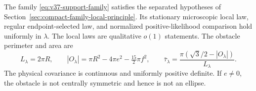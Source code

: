 \begin{proposition}
\label{prop:v37-support-family}
The family \eqref{eq:v37-support-family} satisfies the separated
hypotheses of Section~\ref{sec:compact-family-local-principle}.
Its stationary microscopic local law, regular endpoint-selected law,
and normalized positive-likelihood comparison hold uniformly in
$\lambda$. The local laws are qualitative $o(1)$ statements.
The obstacle perimeter and area are
\begin{equation}\label{eq:v37-support-area}
 L_\lambda=2\pi R,\qquad
 |O_\lambda|=\pi R^2-4\pi e^2-\tfrac{15}{2}\pi f^2,
 \qquad
 \bar\tau_\lambda=\frac{\pi(\sqrt3/2-|O_\lambda|)}{L_\lambda}.
\end{equation}
The physical covariance is continuous and uniformly positive definite.
If $e\ne0$, the obstacle is not centrally symmetric and hence is not
an ellipse.
\end{proposition}
